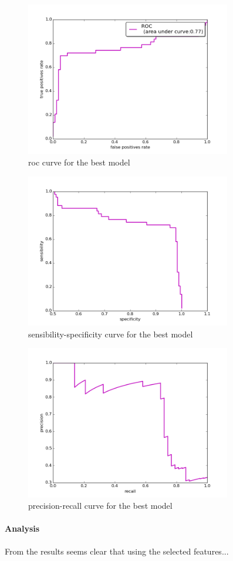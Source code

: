 \begin{figure}[h]
	\centering
	\includegraphics[width= 0.8\textwidth]{chapter4/roc.png}
	\caption{roc curve for the best model}
	\label{fig:roc_best}
\end{figure}

\begin{figure}[h]
	\centering
	\includegraphics[width= 0.8\textwidth]{chapter4/sensibility_specificity.png}
	\caption{sensibility-specificity curve for the best model}
	\label{fig:sensibility_specificity_best}
\end{figure}

\begin{figure}[h]
	\centering
	\includegraphics[width= 0.8\textwidth]{chapter4/precision_recall.png}
	\caption{precision-recall curve for the best model}
	\label{fig:precision_recall_best}
\end{figure}

\paragraph{Analysis}
From the results seems clear that using the selected features...
